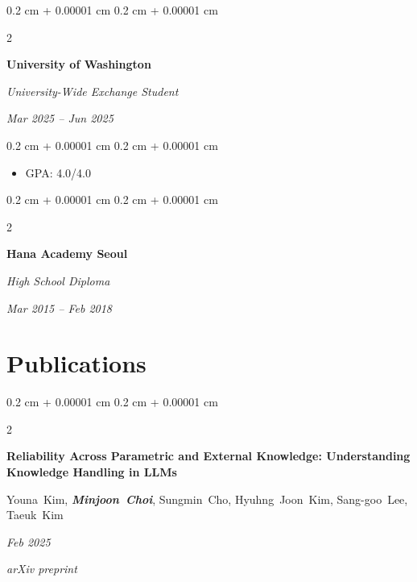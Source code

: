 \documentclass[10pt, letterpaper]{article}
\newenvironment{highlights}{
    \begin{itemize}[
        topsep=0.10 cm,
        parsep=0.10 cm,
        partopsep=0pt,
        itemsep=0pt,
        leftmargin=0.4 cm + 10pt
    ]
}{
    \end{itemize}
} %
\newenvironment{onecolentry}{
    \begin{adjustwidth}{
        0.2 cm + 0.00001 cm
    }{
        0.2 cm + 0.00001 cm
    }
}{
    \end{adjustwidth}
} %
\newenvironment{twocolentry}[2][]{
    \onecolentry
    \def\secondColumn{#2}
    \setcolumnwidth{\fill, 4.5 cm}
    \begin{paracol}{2}
}{
    \switchcolumn \raggedleft \secondColumn
    \end{paracol}
    \endonecolentry
} %
\let\hrefWithoutArrow\href
\renewcommand{\href}[2]{\hrefWithoutArrow{#1}{\ifthenelse{\equal{#2}{}}{ }{#2 }\raisebox{.15ex}{\footnotesize \faExternalLink*}}}
\begin{document}
        \vspace{0.3 cm}

        \begin{twocolentry}{
            \textit{Mar 2025 – Jun 2025}}
            \textbf{University of Washington}

            \textit{University-Wide Exchange Student}
        \end{twocolentry}

        \vspace{0.10 cm}
        \begin{onecolentry}
            \begin{highlights}
                \item GPA: 4.0/4.0
            \end{highlights}
        \end{onecolentry}

        \vspace{0.3 cm}

        \begin{twocolentry}{
            \textit{Mar 2015 – Feb 2018}}
            \textbf{Hana Academy Seoul}

            \textit{High School Diploma}
        \end{twocolentry}


    \section{Publications}

        \begin{twocolentry}{
        \textit{Feb 2025}    
            
        \textit{arXiv preprint}}
            \textbf{Reliability Across Parametric and External Knowledge: Understanding Knowledge Handling in LLMs}

            \vspace{0.10 cm}

            \mbox{Youna Kim}, \mbox{\textbf{\textit{Minjoon Choi}}}, \mbox{Sungmin Cho}, \mbox{Hyuhng Joon Kim}, \mbox{Sang-goo Lee}, \mbox{Taeuk Kim}
        \end{twocolentry}


\end{document}

